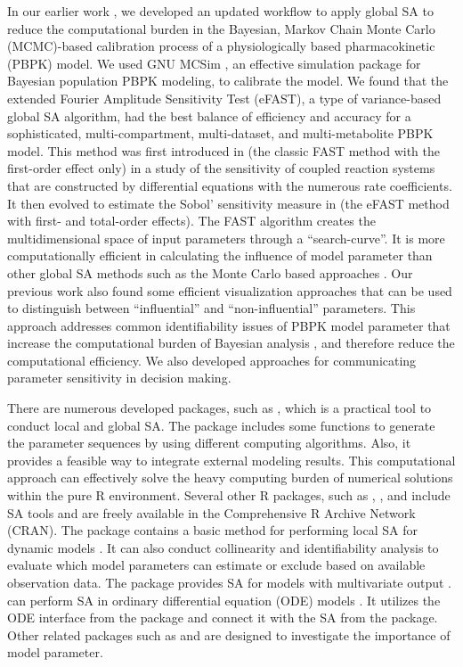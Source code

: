 In our earlier work \citep{fphar201800588}, we developed an updated
workflow to apply global SA to reduce the computational burden in the
Bayesian, Markov Chain Monte Carlo (MCMC)-based calibration process of a
physiologically based pharmacokinetic (PBPK) model. We used GNU MCSim
\citep{bois2009gnu}, an effective simulation package for Bayesian
population PBPK modeling, to calibrate the model. We found that the
extended Fourier Amplitude Sensitivity Test (eFAST), a type of
variance-based global SA algorithm, had the best balance of efficiency
and accuracy for a sophisticated, multi-compartment, multi-dataset, and
multi-metabolite PBPK model. This method was first introduced in
\citet{cukier1973study} (the classic FAST method with the first-order
effect only) in a study of the sensitivity of coupled reaction systems
that are constructed by differential equations with the numerous rate
coefficients. It then evolved to estimate the Sobol' sensitivity measure
in \citet{saltelli1999quantitative} (the eFAST method with first- and
total-order effects). The FAST algorithm creates the multidimensional
space of input parameters through a ``search-curve''. It is more
computationally efficient in calculating the influence of model
parameter than other global SA methods such as the Monte Carlo based
approaches \citep{jansen1999analysis, owen2013better}. Our previous work
also found some efficient visualization approaches that can be used to
distinguish between ``influential'' and ``non-influential'' parameters.
This approach addresses common identifiability issues of PBPK model
parameter that increase the computational burden of Bayesian analysis
\citep{garcia2015identifiability}, and therefore reduce the
computational efficiency. We also developed approaches for communicating
parameter sensitivity in decision making.

There are numerous developed packages, such as 
\citep{R-sensitivity}, which is a practical tool to conduct local and
global SA. The  package includes some functions to
generate the parameter sequences by using different computing
algorithms. Also, it provides a feasible way to integrate external
modeling results. This computational approach can effectively solve the
heavy computing burden of numerical solutions within the pure R
environment. Several other R packages, such as ,
, and  include SA tools and
are freely available in the Comprehensive R Archive Network (CRAN). The
 package contains a basic method for performing local SA
for dynamic models \citep{JSSv033i03}. It can also conduct collinearity
and identifiability analysis to evaluate which model parameters can
estimate or exclude based on available observation data. The
 package provides SA for models with multivariate
output \citep{R-multisensi}.  can perform SA in
ordinary differential equation (ODE) models \citep{R-ODEsensitivity}. It
utilizes the ODE interface from the  package and
connect it with the SA from the  package. Other
related packages such as  \citep{RJ-2015-031} and
 \citep{R-fast} are designed to investigate the importance
of model parameter.

